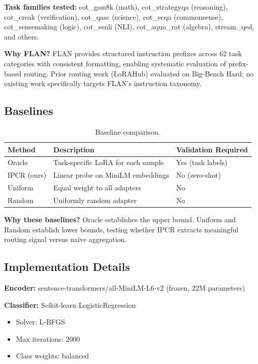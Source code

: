 \textbf{Task families tested:} cot\_gsm8k (math), cot\_strategyqa (reasoning), cot\_creak (verification), cot\_qasc (science), cot\_ecqa (commonsense), cot\_sensemaking (logic), cot\_esnli (NLI), cot\_aqua\_rat (algebra), stream\_qed, and others.

\textbf{Why FLAN?} FLAN provides structured instruction prefixes across 62 task categories with consistent formatting, enabling systematic evaluation of prefix-based routing. Prior routing work (LoRAHub) evaluated on Big-Bench Hard; no existing work specifically targets FLAN's instruction taxonomy.

\subsection{Baselines}

\begin{table}[h]
\centering
\begin{tabular}{lll}
\toprule
\textbf{Method} & \textbf{Description} & \textbf{Validation Required} \\
\midrule
Oracle & Task-specific LoRA for each sample & Yes (task labels) \\
IPCR (ours) & Linear probe on MiniLM embeddings & No (zero-shot) \\
Uniform & Equal weight to all adapters & No \\
Random & Uniformly random adapter & No \\
\bottomrule
\end{tabular}
\caption{Baseline comparison.}
\label{tab:baselines}
\end{table}

\textbf{Why these baselines?} Oracle establishes the upper bound. Uniform and Random establish lower bounds, testing whether IPCR extracts meaningful routing signal versus naive aggregation.

\subsection{Implementation Details}

\textbf{Encoder:} sentence-transformers/all-MiniLM-L6-v2 (frozen, 22M parameters)

\textbf{Classifier:} Scikit-learn LogisticRegression
\begin{itemize}
    \item Solver: L-BFGS
    \item Max iterations: 2000
    \item Class weights: balanced
\end{itemize}

